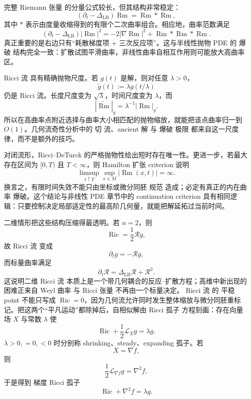 完整 Riemann 张量 的分量公式较长，但其结构非常稳定：
\begin{equation*}\boxed{
(\partial_t-\Delta_{\mathrm{LB}})\operatorname{Rm}
=\operatorname{Rm}*\operatorname{Rm},
}\end{equation*}
其中 $*$ 表示由度量收缩得到的有限个二次曲率组合。相应地，曲率范数满足
\begin{equation*}(\partial_t-\Delta_{\mathrm{LB}})|\operatorname{Rm}|^2
=-2|\nabla\operatorname{Rm}|^2+\operatorname{Rm}*\operatorname{Rm}*\operatorname{Rm}.\end{equation*}
真正重要的是右边只有“耗散梯度项 + 三次反应项”。这与半线性抛物 PDE 的 爆破 结构完全一致：扩散试图平滑曲率，非线性曲率自相互作用则可能放大高曲率区。

Ricci 流 具有精确抛物尺度。若 $g(t)$ 是解，则对任意 $\lambda>0$，
\begin{equation*}\widetilde g(t)
:=\lambda g(t/\lambda)\end{equation*}
仍是 Ricci 流。长度尺度变为 $\sqrt\lambda$，时间尺度变为 $\lambda$，而
\[
|\widetilde{\operatorname{Rm}}|_{\widetilde g}
=\lambda^{-1}|\operatorname{Rm}|_g.
\]
所以在高曲率点附近选择与曲率大小相匹配的抛物缩放，就能把该点曲率归一到 $O(1)$。几何流奇性分析中的 切 流、ancient 解 与 爆破 极限 都来自这一尺度律，而不是额外的技巧。

对闭流形，Ricci--DeTurck 的严格抛物性给出短时存在唯一性。更进一步，若最大存在区间为 $[0,T)$ 且 $T<\infty$，则 Hamilton 扩张 criterion 说明
\begin{equation*}\boxed{
\limsup_{t\uparrow T}
\sup_{x\in M}|\operatorname{Rm}(x,t)|=\infty.
}\end{equation*}
换言之，有限时间失效不能只由坐标或微分同胚 规范 造成；必定有真正的内在曲率 爆破。这个结论与非线性 PDE 章节中的 continuation criterion 具有相同逻辑：只要控制决定局部适定性的最高阶几何量，就能把解延拓过当前时间。

二维情形把这些结构压缩得最透明。若 $n=2$，则
\[
\operatorname{Ric}=\frac12\mathcal R g,
\]
故 Ricci 流 变成
\begin{equation*}\partial_tg=-\mathcal R g,\end{equation*}
而标量曲率满足
\begin{equation*}\boxed{
\partial_t\mathcal R
=\Delta_{\mathrm{LB}}\mathcal R+\mathcal R^2.
}\end{equation*}
这说明二维 Ricci 流 本质上是一个带几何耦合的反应--扩散方程；高维中新出现的困难正来自 Weyl 曲率 与 Ricci 张量 不再由一个标量决定。
Ricci 流 的 平稳 point 不能只写成 $\operatorname{Ric}=0$，因为几何流允许同时发生整体缩放与微分同胚重标记。把这两个“平凡运动”都除掉后，自相似解由 Ricci 孤子 方程刻画：存在向量场 $X$ 与常数 $\lambda$ 使
\begin{equation}
\boxed{
\operatorname{Ric}+\frac12\mathcal L_Xg=\lambda g.
}
\label{eq:math-dg-ricci-soliton}
\end{equation}
$\lambda>0,=0,<0$ 时分别称 shrinking、steady、expanding 孤子。若
\[
X=\nabla f,
\]
则
\[
\frac12\mathcal L_{\nabla f}g=\nabla^2f,
\]
于是得到 梯度 Ricci 孤子
\begin{equation}
\boxed{
\operatorname{Ric}+\nabla^2f=\lambda g.
}
\label{eq:math-dg-gradient-ricci-soliton}
\end{equation}

